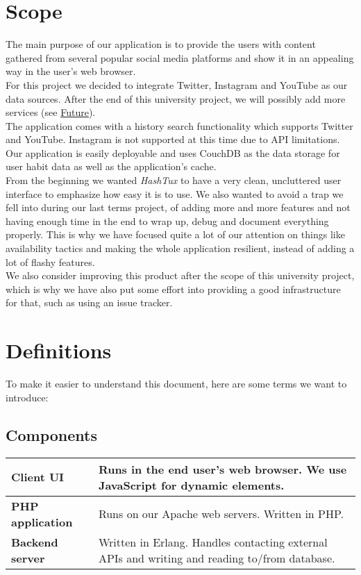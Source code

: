 \section{Scope}
The main purpose of our application is to provide the users with content
gathered from several popular social media platforms and show it in an appealing
way in the user's web browser. \\

For this project we decided to integrate Twitter, Instagram and YouTube as our
data sources. After the end of this university project, we will possibly add
more services (see \hyperlink{future}{Future}). \\

The application comes with a history search functionality which supports Twitter
and YouTube. Instagram is not supported at this time due to API limitations. \\

Our application is easily deployable and uses CouchDB as the data storage for
user habit data as well as the application's cache. \\

From the beginning we wanted \textit{HashTux} to have a very clean, uncluttered
user interface to emphasize how easy it is to use. We also wanted to avoid a
trap we fell into during our last terms project, of adding more and more
features and not having enough time in the end to wrap up, debug and document
everything properly. This is why we have focused quite a lot of our attention on
things like availability tactics and making the whole application resilient,
instead of adding a lot of flashy features. \\

We also consider improving this product after the scope of this university
project, which is why we have also put some effort into providing a good
infrastructure for that, such as using an issue tracker.

\section{Definitions}
To make it easier to understand this document, here are some terms we want to
introduce:

\subsection{Components}
{\tabulinesep=1.4mm
\begin{tabu}{l l}
  \textbf{Client UI}
     & \parbox[t]{8cm}{Runs in the end user's web browser. We use JavaScript for
     dynamic elements.} \\
  \hline
  \textbf{PHP application}
      & Runs on our Apache web servers. Written in PHP. \\
  \hline
  \textbf{Backend server} & \parbox[t]{8cm}{
     Written in Erlang. Handles contacting external APIs and writing and
     reading to/from database.}
\end{tabu}}

